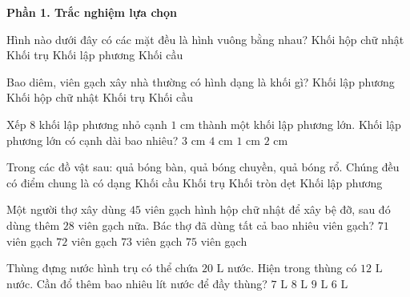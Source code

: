 \textbf{Phần 1. Trắc nghiệm lựa chọn}

\begin{ex} %
Hình nào dưới đây có các mặt đều là hình vuông bằng nhau?
\choice
{Khối hộp chữ nhật}
{Khối trụ}
{\True Khối lập phương}
{Khối cầu}
\end{ex}

\begin{ex} %
Bao diêm, viên gạch xây nhà thường có hình dạng là khối gì?
\choice
{Khối lập phương}
{\True Khối hộp chữ nhật}
{Khối trụ}
{Khối cầu}
\end{ex}

\begin{ex} %
Xếp $8$ khối lập phương nhỏ cạnh $1\text{ cm}$ thành một khối lập phương lớn. Khối lập phương lớn có cạnh dài bao nhiêu?
\choice
{$3\text{ cm}$}
{$4\text{ cm}$}
{$1\text{ cm}$}
{\True $2\text{ cm}$}
\end{ex}

\begin{ex} %
Trong các đồ vật sau: quả bóng bàn, quả bóng chuyền, quả bóng rổ. Chúng đều có điểm chung là có dạng
\choice
{\True Khối cầu}
{Khối trụ}
{Khối tròn dẹt}
{Khối lập phương}
\end{ex}

\begin{ex} %
Một người thợ xây dùng $45$ viên gạch hình hộp chữ nhật để xây bệ đỡ, sau đó dùng thêm $28$ viên gạch nữa. Bác thợ đã dùng tất cả bao nhiêu viên gạch?
\choice
{$71$ viên gạch}
{$72$ viên gạch}
{\True $73$ viên gạch}
{$75$ viên gạch}
\end{ex}

\begin{ex} %
Thùng đựng nước hình trụ có thể chứa $20\text{ L}$ nước. Hiện trong thùng có $12\text{ L}$ nước. Cần đổ thêm bao nhiêu lít nước để đầy thùng?
\choice
{$7\text{ L}$}
{\True $8\text{ L}$}
{$9\text{ L}$}
{$6\text{ L}$}
\end{ex}

